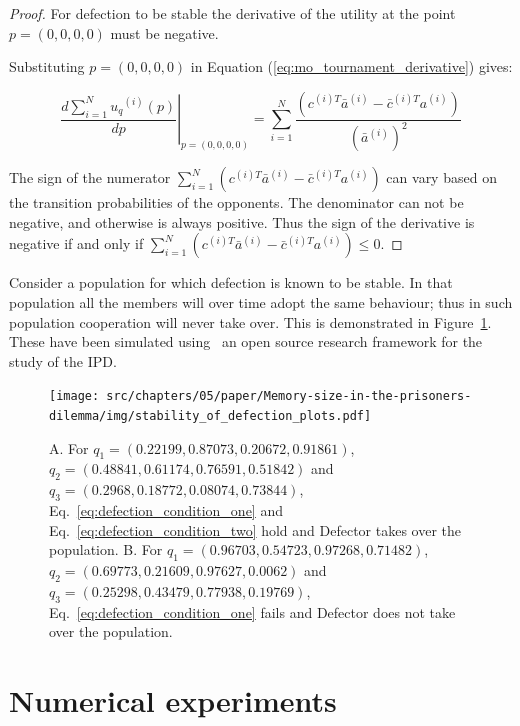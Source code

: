 \begin{proof}
    For defection to be stable the derivative of the utility
    at the point \(p = (0, 0, 0, 0)\) must be negative.

    Substituting \(p = (0, 0, 0, 0)\) in
    Equation (\ref{eq:mo_tournament_derivative}) gives:

    \begin{equation}
        \left.\frac{d\sum\limits_{i=1} ^ {N} {u_q}^{(i)} (p)}{dp} \right\rvert_{p=(0,0,0,0)} =
    \sum_{i=1} ^ N \frac{(c^{(i)T} \bar{a}^{(i)} - \bar{c}^{(i)T} a^{(i)})}
    {(\bar{a}^{(i)})^2}
    \end{equation}

    The sign of the numerator \( \displaystyle\sum_{i=1} ^ N (c^{(i)T} \bar{a}^{(i)} - \bar{c}^{(i)T} a^{(i)})\)
    can vary based on the transition probabilities of the opponents.
    The denominator can not be negative, and otherwise is always positive.
    Thus the sign of the derivative is negative if and only if
    \( \displaystyle\sum_{i=1} ^ N (c^{(i)T} \bar{a}^{(i)} - \bar{c}^{(i)T} a^{(i)}) \leq 0\).
\end{proof}

Consider a population for which defection is known to be stable. In that
population all the members will over time adopt the same behaviour; thus in such
population cooperation will never take over. This is demonstrated in
Figure~\ref{fig:stability_of_defection}.
These have been simulated using~\cite{axelrodproject} an open
source research framework for the study of the IPD.

\begin{figure}[!htbp]
    \centering
    \texttt{[image: src/chapters/05/paper/Memory-size-in-the-prisoners-dilemma/img/stability\_of\_defection\_plots.pdf]}
    \caption{A. For \(q_{1}=(0.22199, 0.87073, 0.20672, 0.91861)\),
    $q_{2}=(0.48841, 0.61174, 0.76591, 0.51842)$ and
    $q_{3}=(0.2968, 0.18772, 0.08074, 0.73844)$, Eq.~\ref{eq:defection_condition_one} and
    Eq.~\ref{eq:defection_condition_two} hold and Defector takes over the
    population. B. For $q_{1}=(0.96703, 0.54723, 0.97268, 0.71482)$,
    $q_{2}=(0.69773, 0.21609, 0.97627, 0.0062)$ and
    $q_{3}=(0.25298, 0.43479, 0.77938, 0.19769)$, Eq.~\ref{eq:defection_condition_one} fails
    and Defector does not take over the population.}\label{fig:stability_of_defection}
\end{figure}

\section{Numerical experiments} \label{section:numerical_experiments}

